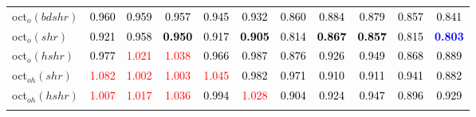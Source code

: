 \begin{tabular}[t]{l|>{}cccc>{}c|ccccc}
oct$_o(bdshr)$ & \textcolor{black}{0.960} & \textcolor{black}{0.959} & \textcolor{black}{0.957} & \textcolor{black}{0.945} & \textcolor{black}{0.932} & \textcolor{black}{0.860} & \textcolor{black}{0.884} & \textcolor{black}{0.879} & \textcolor{black}{0.857} & \textcolor{black}{0.841}\\
oct$_o(shr)$ & \textcolor{black}{0.921} & \textcolor{black}{0.958} & \textcolor{black}{\textbf{0.950}} & \textcolor{black}{0.917} & \textcolor{black}{\textbf{0.905}} & \textcolor{black}{0.814} & \textcolor{black}{\textbf{0.867}} & \textcolor{black}{\textbf{0.857}} & \textcolor{black}{0.815} & \textcolor{blue}{\textbf{0.803}}\\
oct$_o(hshr)$ & \textcolor{black}{0.977} & \textcolor{red}{1.021} & \textcolor{red}{1.038} & \textcolor{black}{0.966} & \textcolor{black}{0.987} & \textcolor{black}{0.876} & \textcolor{black}{0.926} & \textcolor{black}{0.949} & \textcolor{black}{0.868} & \textcolor{black}{0.889}\\
oct$_{oh}(shr)$ & \textcolor{red}{1.082} & \textcolor{red}{1.002} & \textcolor{red}{1.003} & \textcolor{red}{1.045} & \textcolor{black}{0.982} & \textcolor{black}{0.971} & \textcolor{black}{0.910} & \textcolor{black}{0.911} & \textcolor{black}{0.941} & \textcolor{black}{0.882}\\
oct$_{oh}(hshr)$ & \textcolor{red}{1.007} & \textcolor{red}{1.017} & \textcolor{red}{1.036} & \textcolor{black}{0.994} & \textcolor{red}{1.028} & \textcolor{black}{0.904} & \textcolor{black}{0.924} & \textcolor{black}{0.947} & \textcolor{black}{0.896} & \textcolor{black}{0.929}\\
\bottomrule
{}\\
\end{tabular}
